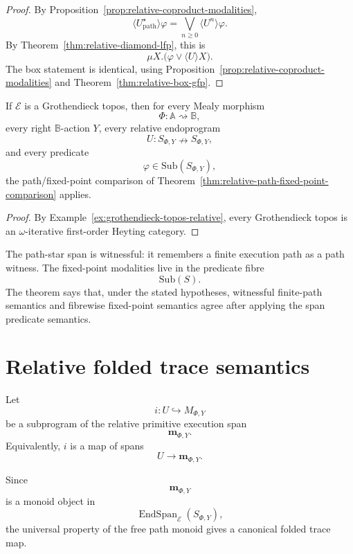 \begin{proof}
By Proposition~\ref{prop:relative-coproduct-modalities},
\[
\langle U^\star_{\mathrm{path}}\rangle\varphi
=
\bigvee_{n\ge0}\langle U^n\rangle\varphi.
\]
By Theorem~\ref{thm:relative-diamond-lfp}, this is
\[
\mu X.\bigl(\varphi\vee\langle U\rangle X\bigr).
\]
The box statement is identical, using
Proposition~\ref{prop:relative-coproduct-modalities} and
Theorem~\ref{thm:relative-box-gfp}.
\end{proof}

\begin{corollary}
\label{cor:grothendieck-topos-relative-path-fixed-point}
If \(\mathcal E\) is a Grothendieck topos, then for every Mealy morphism
\[
\Phi:\mathbb A\rightsquigarrow\mathbb B,
\]
every right \(\mathbb B\)-action \(Y\), every relative endoprogram
\[
U:S_{\Phi,Y}\nrightarrow S_{\Phi,Y},
\]
and every predicate
\[
\varphi\in\mathrm{Sub}(S_{\Phi,Y}),
\]
the path/fixed-point comparison of
Theorem~\ref{thm:relative-path-fixed-point-comparison} applies.
\end{corollary}

\begin{proof}
By Example~\ref{ex:grothendieck-topos-relative}, every Grothendieck topos is
an \(\omega\)-iterative first-order Heyting category.
\end{proof}

\begin{remark}
\label{rem:relative-path-fixed-point-meaning}
The path-star span is witnessful: it remembers a finite execution path as a
path witness. The fixed-point modalities live in the predicate fibre
\[
\mathrm{Sub}(S).
\]
The theorem says that, under the stated hypotheses, witnessful finite-path
semantics and fibrewise fixed-point semantics agree after applying the span
predicate semantics.
\end{remark}

\section{Relative folded trace semantics}
\label{sec:relative-folded-trace-semantics}

Let
\[
i:U\hookrightarrow M_{\Phi,Y}
\]
be a subprogram of the relative primitive execution span
\[
\mathbf m_{\Phi,Y}.
\]
Equivalently, \(i\) is a map of spans
\[
U\to\mathbf m_{\Phi,Y}.
\]

Since
\[
\mathbf m_{\Phi,Y}
\]
is a monoid object in
\[
\operatorname{EndSpan}_{\mathcal E}(S_{\Phi,Y}),
\]
the universal property of the free path monoid gives a canonical folded trace
map.

